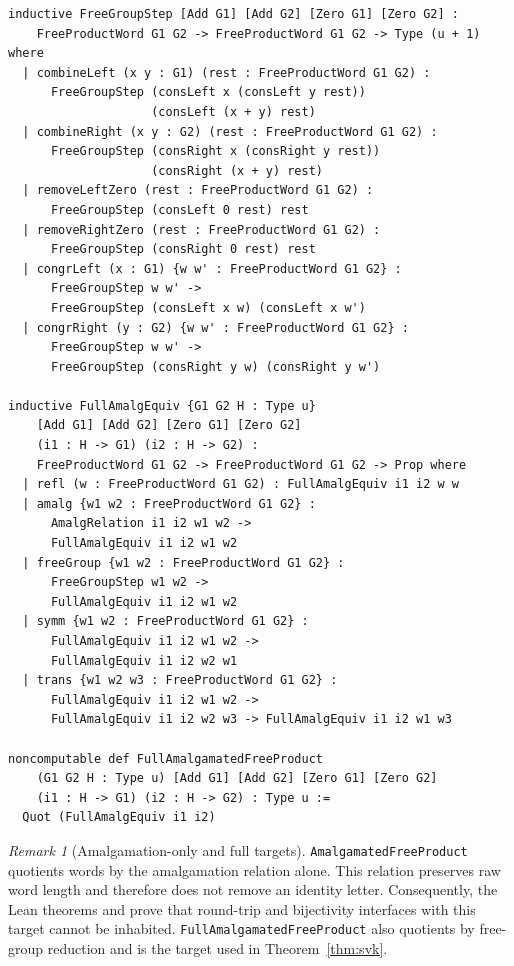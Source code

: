 \documentclass{lmcs}
\theoremstyle{definition}
\theoremstyle{plain}
\theoremstyle{remark}
\newtheorem{remark}[definition]{Remark}
\begin{document}
\begin{lstlisting}
inductive FreeGroupStep [Add G1] [Add G2] [Zero G1] [Zero G2] :
    FreeProductWord G1 G2 -> FreeProductWord G1 G2 -> Type (u + 1) where
  | combineLeft (x y : G1) (rest : FreeProductWord G1 G2) :
      FreeGroupStep (consLeft x (consLeft y rest))
                    (consLeft (x + y) rest)
  | combineRight (x y : G2) (rest : FreeProductWord G1 G2) :
      FreeGroupStep (consRight x (consRight y rest))
                    (consRight (x + y) rest)
  | removeLeftZero (rest : FreeProductWord G1 G2) :
      FreeGroupStep (consLeft 0 rest) rest
  | removeRightZero (rest : FreeProductWord G1 G2) :
      FreeGroupStep (consRight 0 rest) rest
  | congrLeft (x : G1) {w w' : FreeProductWord G1 G2} :
      FreeGroupStep w w' ->
      FreeGroupStep (consLeft x w) (consLeft x w')
  | congrRight (y : G2) {w w' : FreeProductWord G1 G2} :
      FreeGroupStep w w' ->
      FreeGroupStep (consRight y w) (consRight y w')

inductive FullAmalgEquiv {G1 G2 H : Type u}
    [Add G1] [Add G2] [Zero G1] [Zero G2]
    (i1 : H -> G1) (i2 : H -> G2) :
    FreeProductWord G1 G2 -> FreeProductWord G1 G2 -> Prop where
  | refl (w : FreeProductWord G1 G2) : FullAmalgEquiv i1 i2 w w
  | amalg {w1 w2 : FreeProductWord G1 G2} :
      AmalgRelation i1 i2 w1 w2 ->
      FullAmalgEquiv i1 i2 w1 w2
  | freeGroup {w1 w2 : FreeProductWord G1 G2} :
      FreeGroupStep w1 w2 ->
      FullAmalgEquiv i1 i2 w1 w2
  | symm {w1 w2 : FreeProductWord G1 G2} :
      FullAmalgEquiv i1 i2 w1 w2 ->
      FullAmalgEquiv i1 i2 w2 w1
  | trans {w1 w2 w3 : FreeProductWord G1 G2} :
      FullAmalgEquiv i1 i2 w1 w2 ->
      FullAmalgEquiv i1 i2 w2 w3 -> FullAmalgEquiv i1 i2 w1 w3

noncomputable def FullAmalgamatedFreeProduct
    (G1 G2 H : Type u) [Add G1] [Add G2] [Zero G1] [Zero G2]
    (i1 : H -> G1) (i2 : H -> G2) : Type u :=
  Quot (FullAmalgEquiv i1 i2)
\end{lstlisting}

\begin{remark}[Amalgamation-only and full targets]
\texttt{AmalgamatedFreeProduct} quotients words by the amalgamation relation
alone.  This relation preserves raw word length and therefore does not remove
an identity letter.  Consequently, the Lean theorems
 and
 prove that round-trip and
bijectivity interfaces with this target cannot be inhabited.
\texttt{FullAmalgamatedFreeProduct} also quotients by free-group reduction and
is the target used in Theorem~\ref{thm:svk}.
\end{remark}
\end{document}
